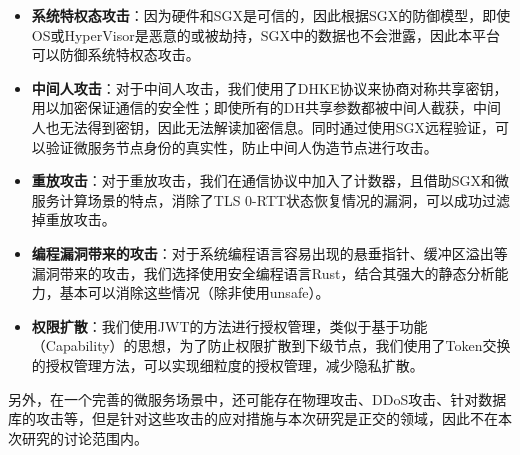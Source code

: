 \begin{itemize}
    \item \textbf{系统特权态攻击}：因为硬件和SGX是可信的，因此根据SGX的防御模型，即使OS或HyperVisor是恶意的或被劫持，SGX中的数据也不会泄露，因此本平台可以防御系统特权态攻击。
    \item \textbf{中间人攻击}：对于中间人攻击，我们使用了DHKE协议来协商对称共享密钥，用以加密保证通信的安全性；即使所有的DH共享参数都被中间人截获，中间人也无法得到密钥，因此无法解读加密信息。同时通过使用SGX远程验证，可以验证微服务节点身份的真实性，防止中间人伪造节点进行攻击。
    \item \textbf{重放攻击}：对于重放攻击，我们在通信协议中加入了计数器，且借助SGX和微服务计算场景的特点，消除了TLS 0-RTT状态恢复情况的漏洞，可以成功过滤掉重放攻击。
    \item \textbf{编程漏洞带来的攻击}：对于系统编程语言容易出现的悬垂指针、缓冲区溢出等漏洞带来的攻击，我们选择使用安全编程语言Rust，结合其强大的静态分析能力，基本可以消除这些情况（除非使用unsafe）。
    \item \textbf{权限扩散}：我们使用JWT的方法进行授权管理，类似于基于功能（Capability）的思想，为了防止权限扩散到下级节点，我们使用了Token交换的授权管理方法，可以实现细粒度的授权管理，减少隐私扩散。
\end{itemize}

另外，在一个完善的微服务场景中，还可能存在物理攻击、DDoS攻击、针对数据库的攻击等，但是针对这些攻击的应对措施与本次研究是正交的领域，因此不在本次研究的讨论范围内。
